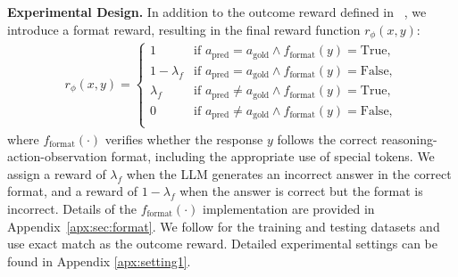\textbf{Experimental Design.} 
In addition to the outcome reward defined in ~\citep{jin2025search,zheng2025deepresearcher}, we introduce a format reward, resulting in the final reward function $r_{\phi}(x, y)$:
\begin{gather}
r_{\phi}(x, y) = 
\begin{cases}
    1              & \text{if } a_{\text{pred}} = a_{\text{gold}} \land f_{\text{format}}(y) = \text{True}, \\
    1 - \lambda_f    & \text{if } a_{\text{pred}} = a_{\text{gold}} \land f_{\text{format}}(y) = \text{False}, \\
    \lambda_f        & \text{if } a_{\text{pred}} \neq a_{\text{gold}} \land f_{\text{format}}(y) = \text{True}, \\
    0              & \text{if } a_{\text{pred}} \neq a_{\text{gold}} \land f_{\text{format}}(y) = \text{False}, \\
\end{cases}
\end{gather}
where $f_\text{format}(\cdot)$ verifies whether the response $y$ follows the correct reasoning-action-observation format, including the appropriate use of special tokens.
We assign a reward of $\lambda_f$ when the LLM generates an incorrect answer in the correct format, and a reward of $1 - \lambda_f$ when the answer is correct but the format is incorrect.
Details of the $f_\text{format}(\cdot)$ implementation are provided in Appendix~\ref{apx:sec:format}.
We follow \cite{jin2025search} for the training and testing datasets and use exact match as the outcome reward.
Detailed experimental settings can be found in Appendix \ref{apx:setting1}.

